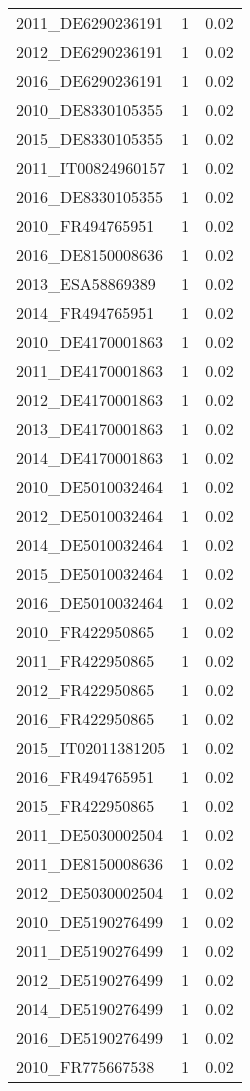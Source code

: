 \begin{table*}[htbp]
\begin{tabular}{lrr}
2011_DE6290236191 & 1 & 0.02 \\
2012_DE6290236191 & 1 & 0.02 \\
2016_DE6290236191 & 1 & 0.02 \\
2010_DE8330105355 & 1 & 0.02 \\
2015_DE8330105355 & 1 & 0.02 \\
2011_IT00824960157 & 1 & 0.02 \\
2016_DE8330105355 & 1 & 0.02 \\
2010_FR494765951 & 1 & 0.02 \\
2016_DE8150008636 & 1 & 0.02 \\
2013_ESA58869389 & 1 & 0.02 \\
2014_FR494765951 & 1 & 0.02 \\
2010_DE4170001863 & 1 & 0.02 \\
2011_DE4170001863 & 1 & 0.02 \\
2012_DE4170001863 & 1 & 0.02 \\
2013_DE4170001863 & 1 & 0.02 \\
2014_DE4170001863 & 1 & 0.02 \\
2010_DE5010032464 & 1 & 0.02 \\
2012_DE5010032464 & 1 & 0.02 \\
2014_DE5010032464 & 1 & 0.02 \\
2015_DE5010032464 & 1 & 0.02 \\
2016_DE5010032464 & 1 & 0.02 \\
2010_FR422950865 & 1 & 0.02 \\
2011_FR422950865 & 1 & 0.02 \\
2012_FR422950865 & 1 & 0.02 \\
2016_FR422950865 & 1 & 0.02 \\
2015_IT02011381205 & 1 & 0.02 \\
2016_FR494765951 & 1 & 0.02 \\
2015_FR422950865 & 1 & 0.02 \\
2011_DE5030002504 & 1 & 0.02 \\
2011_DE8150008636 & 1 & 0.02 \\
2012_DE5030002504 & 1 & 0.02 \\
2010_DE5190276499 & 1 & 0.02 \\
2011_DE5190276499 & 1 & 0.02 \\
2012_DE5190276499 & 1 & 0.02 \\
2014_DE5190276499 & 1 & 0.02 \\
2016_DE5190276499 & 1 & 0.02 \\
2010_FR775667538 & 1 & 0.02 \\

\end{tabular}
\end{table*}
